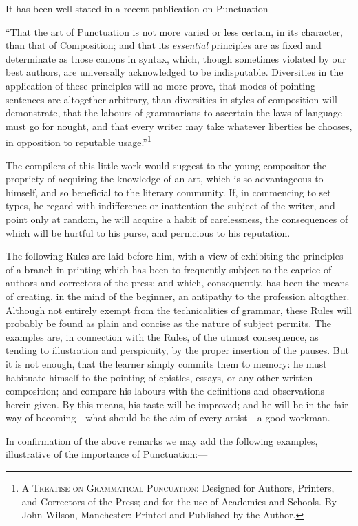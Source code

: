 It has been well stated in a recent publication on Punct\-uation---

\small
``That the art of Punctuation is not more varied or less certain, in its
character, than that of Composition; and that its \emph{essential} principles
are as fixed and determinate as those canons in syntax, which, though sometimes
violated by our best authors, are universally acknowledged to be indisputable.
Diversities in the application of these principles will no more prove, that
modes of pointing sentences are altogether arbitrary, than diversities in
styles of composition will demonstrate, that the labours of grammarians to
ascertain the laws of language must go for nought, and that every writer may
take whatever liberties he chooses, in opposition to reputable
usage.''\footnote{\textsc{A Treatise on Grammatical Puncuation}: Designed for
Authors, Printers, and Correctors of the Press; and for the use of Academies and
Schools. By John Wilson, Manchester: Printed and Published by the Author.}

\normalsize
The compilers of this little work would suggest to the young compositor
the propriety of acquiring the knowledge of an art, which is so advantageous to
himself, and so beneficial to the literary community. If, in commencing to set
types, he regard with indifference or inattention the subject of the writer, and
point only at random, he will acquire a habit of carelessness, the consequences
of which will be hurtful to his purse, and pernicious to his reputation.

The following Rules are laid before him, with a view of exhibiting the
principles of a branch in printing which has been to frequently subject to the
caprice of authors and correctors of the press; and which, consequently, has
been the means of creating, in the mind of the beginner, an antipathy to the
profession altogther. Although not entirely exempt from the technicalities of
grammar, these Rules will probably be found as plain and concise as the nature
of subject permits. The examples are, in connection with the Rules, of the
utmost consequence, as tending to illustration and perspicuity, by the proper
insertion of the pauses. But it is not enough, that the learner simply commits
them to memory: he must habituate himself to the pointing of epistles, essays,
or any other written composition; and compare his labours with the definitions
and observations herein given. By this means, his taste will be improved; and he
will be in the fair way of becoming---what should be the aim of every artist---a
good workman.

In confirmation of the above remarks we may add the following examples,
illustrative of the importance of Punctuation:---
